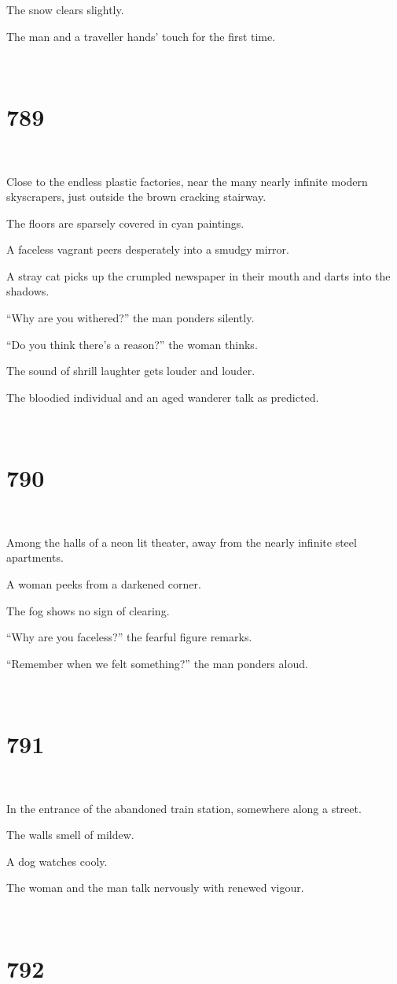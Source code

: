 \documentclass{report}
\begin{document}
The snow clears slightly.

The man and a traveller hands' touch for the first time.

~
\chapter*{789}
~

Close to the endless plastic factories, near the many nearly infinite modern skyscrapers, just outside the brown cracking stairway.

The floors are sparsely covered in cyan paintings.

A faceless vagrant peers desperately into a smudgy mirror.

A stray cat picks up the crumpled newspaper in their mouth and darts into the shadows.

``Why are you withered?'' the man ponders silently.

``Do you think there's a reason?'' the woman thinks.

The sound of shrill laughter gets louder and louder.

The bloodied individual and an aged wanderer talk as predicted.

~
\chapter*{790}
~

Among the halls of a neon lit theater, away from the nearly infinite steel apartments.

A woman peeks from a darkened corner.

The fog shows no sign of clearing.

``Why are you faceless?'' the fearful figure remarks.

``Remember when we felt something?'' the man ponders aloud.

~
\chapter*{791}
~

In the entrance of the abandoned train station, somewhere along a street.

The walls smell of mildew.

A dog watches cooly.

The woman and the man talk nervously with renewed vigour.

~
\chapter*{792}
~
\end{document}
